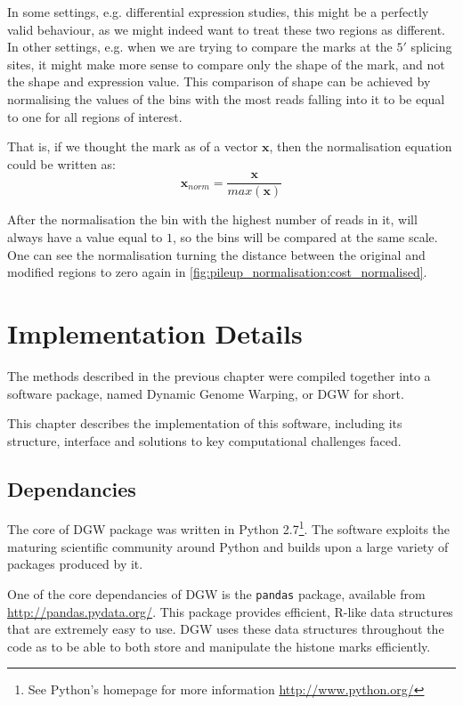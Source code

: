 \documentclass[parskip]{cs4rep}
\begin{document}
In some settings, e.g. differential expression studies, this might be a perfectly valid behaviour, as we might indeed want to treat these two regions as different.
In other settings, e.g. when we are trying to compare the marks at the $5'$ splicing sites, it might make more sense to compare only the shape of the mark, and not the shape and expression value. This comparison of shape can be achieved by normalising the values of the bins with the most reads falling into it to be equal to one for all regions of interest.

That is, if we thought the mark as of a vector $\mathbf{x}$, then the normalisation equation could be written as:
\begin{equation}
   \mathbf{x}_{norm} = \frac{\mathbf{x}}{max (\mathbf{x})}
\end{equation}

After the normalisation the bin with the highest number of reads in it, will always have a value equal to $1$, so the bins will be compared at the same scale. One can see the normalisation turning the distance between the original and modified regions to zero again in \autoref{fig:pileup_normalisation:cost_normalised}.

\chapter{Implementation Details}
\label{cha:implementation-details}
The methods described in the previous chapter were compiled together into a software package, named Dynamic Genome Warping, or DGW for short. 

This chapter describes the implementation of this software, including its structure, interface and solutions to key computational challenges faced.

\section{Dependancies}
The core of DGW package was written in Python 2.7\footnote{See Python's homepage for more information \url{http://www.python.org/}}. The software exploits the maturing scientific community around Python and builds upon a large variety of packages produced by it.

One of the core dependancies of DGW is the \verb"pandas" package, available from \url{http://pandas.pydata.org/}. This package provides efficient, R-like data structures that are extremely easy to use. DGW uses these data structures throughout the code as to be able to both store and manipulate the histone marks efficiently. 
\end{document}
